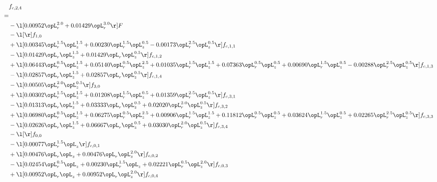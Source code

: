 \begin{alignat}{2} 
\label{eq:f_24_1} 
& f_{c,2,4} \nonumber \\ 
 = \\ 
& - \l[  0.00952 \opL_r^{2.0} +  0.01429 \opL_r^{3.0}  \r] F \nonumber \\ 
& - \l[  \r] f_{1,0} \nonumber \\ 
& + \l[  0.00345 \opL_r^{1.5} \opL_z^{1.5} +  0.00230 \opL_r^{1.5} \opL_z^{0.5}   -0.00173 \opL_r^{2.5} \opL_z^{0.5}  \r] f_{c,1,1} \nonumber \\ 
& - \l[  0.01429 \opL_r \opL_z^{1.5} +  0.01429 \opL_r \opL_z^{0.5}  \r] f_{c,1,2} \nonumber \\ 
& + \l[  0.06443 \opL_r^{0.5} \opL_z^{1.5} +  0.05140 \opL_r^{0.5} \opL_z^{2.5} +  0.01035 \opL_r^{1.5} \opL_z^{1.5} +  0.07363 \opL_r^{0.5} \opL_z^{0.5} +  0.00690 \opL_r^{1.5} \opL_z^{0.5}   -0.00288 \opL_r^{2.5} \opL_z^{0.5}  \r] f_{c,1,3} \nonumber \\ 
& - \l[  0.02857 \opL_r \opL_z^{1.5} +  0.02857 \opL_r \opL_z^{0.5}  \r] f_{c,1,4} \nonumber \\ 
& - \l[  0.00505 \opL_r^{2.0} \opL_z^{0.5}  \r] f_{3,0} \nonumber \\ 
& + \l[  0.00302 \opL_r^{1.5} \opL_z^{1.5} +  0.01208 \opL_r^{1.5} \opL_z^{0.5} +  0.01359 \opL_r^{2.5} \opL_z^{0.5}  \r] f_{c,3,1} \nonumber \\ 
& - \l[  0.01313 \opL_r \opL_z^{1.5} +  0.03333 \opL_r \opL_z^{0.5} +  0.02020 \opL_r^{2.0} \opL_z^{0.5}  \r] f_{c,3,2} \nonumber \\ 
& + \l[  0.06980 \opL_r^{0.5} \opL_z^{1.5} +  0.06275 \opL_r^{0.5} \opL_z^{2.5} +  0.00906 \opL_r^{1.5} \opL_z^{1.5} +  0.11812 \opL_r^{0.5} \opL_z^{0.5} +  0.03624 \opL_r^{1.5} \opL_z^{0.5} +  0.02265 \opL_r^{2.5} \opL_z^{0.5}  \r] f_{c,3,3} \nonumber \\ 
& - \l[  0.02626 \opL_r \opL_z^{1.5} +  0.06667 \opL_r \opL_z^{0.5} +  0.03030 \opL_r^{2.0} \opL_z^{0.5}  \r] f_{c,3,4} \nonumber \\ 
& - \l[  \r] f_{0,0} \nonumber \\ 
& - \l[  0.00077 \opL_r^{1.5} \opL_z  \r] f_{c,0,1} \nonumber \\ 
& + \l[  0.00476 \opL_r \opL_z +  0.00476 \opL_r \opL_z^{2.0}  \r] f_{c,0,2} \nonumber \\ 
& - \l[  0.02454 \opL_r^{0.5} \opL_z +  0.00230 \opL_r^{1.5} \opL_z +  0.02221 \opL_r^{0.5} \opL_z^{2.0}  \r] f_{c,0,3} \nonumber \\ 
& + \l[  0.00952 \opL_r \opL_z +  0.00952 \opL_r \opL_z^{2.0}  \r] f_{c,0,4} \nonumber \\ 

\end{alignat}
